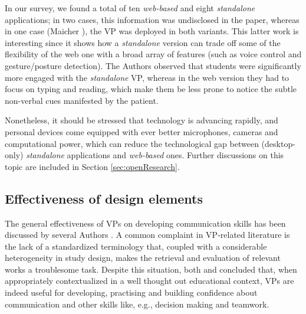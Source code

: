In our survey, we found a total of ten \emph{web-based} and eight \emph{standalone} applications; in two cases, this information was undisclosed in the paper, whereas in one case (Maicher \cite{maicher2017developing}), the VP was deployed in both variants. This latter work is interesting since it shows how a \emph{standalone} version can trade off some of the flexibility of the web one with a broad array of  features (such as voice control and gesture/posture detection). 
The Authors observed that students were significantly more engaged with the \emph{standalone} VP, whereas in the web version they had to focus on typing and reading, which make them be less prone to notice the subtle non-verbal cues manifested by the patient.


Nonetheless, it should be stressed that technology is advancing rapidly, and personal devices come equipped with ever better microphones, cameras and computational power, which can reduce the technological gap between (desktop-only) \emph{standalone} applications and \emph{web-based} ones. Further discussions on this topic are included in Section \ref{sec:openResearch}.  
    

    
\subsection{Effectiveness of design elements}
\label{sec:effectiveness}
The general effectiveness of VPs on developing communication skills has been discussed by several Authors \cite{lee2020effective,peddle2016virtual,richardson2019virtualreview}. A common complaint in VP-related literature is the lack of a standardized terminology that, coupled with a considerable heterogeneity in study design, makes the retrieval and evaluation of relevant works a troublesome task. Despite this situation, both \cite{lee2020effective} and \cite{peddle2016virtual} concluded that, when appropriately contextualized in a well thought out educational context, VPs are indeed useful for developing, practising and building confidence about communication and other skills like, e.g., decision making and teamwork.  

